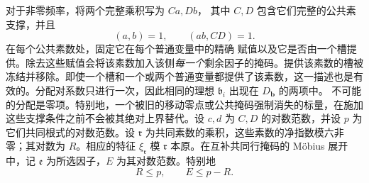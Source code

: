 \documentclass[11pt,a4paper]{article}
\numberwithin{equation}{section}
\numberwithin{figure}{section}
\theoremstyle{definition}
\theoremstyle{remark}
\begin{document}
对于非零频率，将两个完整乘积写为 \(Ca,Db\)，
其中 \(C,D\) 包含它们完整的公共素支撑，并且
\[
 (a,b)=1,\qquad (ab,CD)=1.
\]
在每个公共素数处，固定它在每个普通变量中的精确
赋值以及它是否由一个槽提供。除去这些赋值会将该素数加入该侧\emph{每一个}剩余因子的掩码。提供该素数的槽被冻结并移除。即使一个槽和一个或两个普通变量都提供了该素数，这一描述也是有效的。分配对系数只进行一次，因此相同的理想
\(\mathfrak b_i\) 出现在 \(D_{\mathbf b}\) 的两项中。
不可能的分配是零项。特别地，一个被旧的移动零点或公共掩码强制消失的标量，在施加这些支撑条件之前不会被其绝对上界替代。设 \(c,d\) 为 \(C,D\) 的对数范数，并设 \(p\) 为它们共同根式的对数范数。设 \(\mathfrak r\) 为共同素数的乘积，这些素数的净指数模六非零；其对数为 \(R\)。相应的特征 \(\xi_{\mathfrak r}\) 模 \(\mathfrak r\) 本原。在互补共同行掩码的 M\"obius 展开中，记 \(\mathfrak e\) 为所选因子，\(E\) 为其对数范数。特别地
\[
 R\le p,\qquad E\le p-R.
\]
\end{document}
